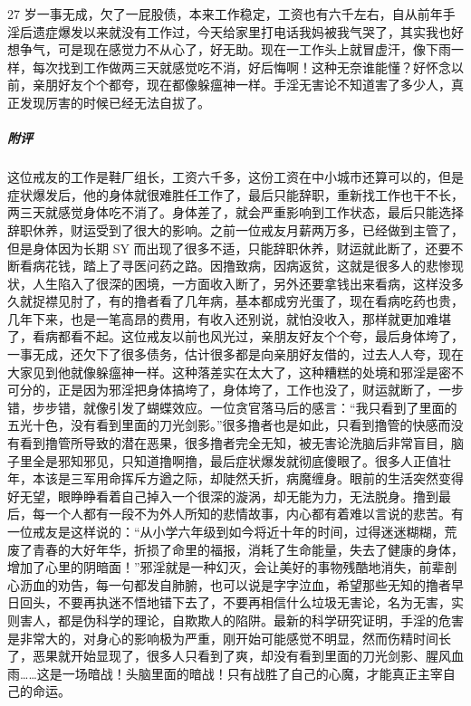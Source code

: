 \begin{case}
    27 岁一事无成，欠了一屁股债，本来工作稳定，工资也有六千左右，自从前年手淫后遗症爆发以来就没有工作过，今天给家里打电话我妈被我气哭了，其实我也好想争气，可是现在感觉力不从心了，好无助。现在一工作头上就冒虚汗，像下雨一样，每次找到工作做两三天就感觉吃不消，好后悔啊！这种无奈谁能懂？好怀念以前，亲朋好友个个都夸，现在都像躲瘟神一样。手淫无害论不知道害了多少人，真正发现厉害的时候已经无法自拔了。
    \subparagraph{附评} 这位戒友的工作是鞋厂组长，工资六千多，这份工资在中小城市还算可以的，但是症状爆发后，他的身体就很难胜任工作了，最后只能辞职，重新找工作也干不长，两三天就感觉身体吃不消了。身体差了，就会严重影响到工作状态，最后只能选择辞职休养，财运受到了很大的影响。之前一位戒友月薪两万多，已经做到主管了，但是身体因为长期 SY 而出现了很多不适，只能辞职休养，财运就此断了，还要不断看病花钱，踏上了寻医问药之路。因撸致病，因病返贫，这就是很多人的悲惨现状，人生陷入了很深的困境，一方面收入断了，另外还要拿钱出来看病，这样没多久就捉襟见肘了，有的撸者看了几年病，基本都成穷光蛋了，现在看病吃药也贵，几年下来，也是一笔高昂的费用，有收入还别说，就怕没收入，那样就更加难堪了，看病都看不起。这位戒友以前也风光过，亲朋友好友个个夸，最后身体垮了，一事无成，还欠下了很多债务，估计很多都是向亲朋好友借的，过去人人夸，现在大家见到他就像躲瘟神一样。这种落差实在太大了，这种糟糕的处境和邪淫是密不可分的，正是因为邪淫把身体搞垮了，身体垮了，工作也没了，财运就断了，一步错，步步错，就像引发了蝴蝶效应。一位贪官落马后的感言：“我只看到了里面的五光十色，没有看到里面的刀光剑影。”很多撸者也是如此，只看到撸管的快感而没有看到撸管所导致的潜在恶果，很多撸者完全无知，被无害论洗脑后非常盲目，脑子里全是邪知邪见，只知道撸啊撸，最后症状爆发就彻底傻眼了。很多人正值壮年，本该是三军用命挥斥方遒之际，却陡然夭折，病魔缠身。眼前的生活突然变得好无望，眼睁睁看着自己掉入一个很深的漩涡，却无能为力，无法脱身。撸到最后，每一个人都有一段不为外人所知的悲情故事，内心都有着难以言说的悲苦。有一位戒友是这样说的：“从小学六年级到如今将近十年的时间，过得迷迷糊糊，荒废了青春的大好年华，折损了命里的福报，消耗了生命能量，失去了健康的身体，增加了心里的阴暗面！”邪淫就是一种幻灭，会让美好的事物残酷地消失，前辈剖心沥血的劝告，每一句都发自肺腑，也可以说是字字泣血，希望那些无知的撸者早日回头，不要再执迷不悟地错下去了，不要再相信什么垃圾无害论，名为无害，实则害人，都是伪科学的理论，自欺欺人的陷阱。最新的科学研究证明，手淫的危害是非常大的，对身心的影响极为严重，刚开始可能感觉不明显，然而伤精时间长了，恶果就开始显现了，很多人只看到了爽，却没有看到里面的刀光剑影、腥风血雨……这是一场暗战！头脑里面的暗战！只有战胜了自己的心魔，才能真正主宰自己的命运。
\end{case}

